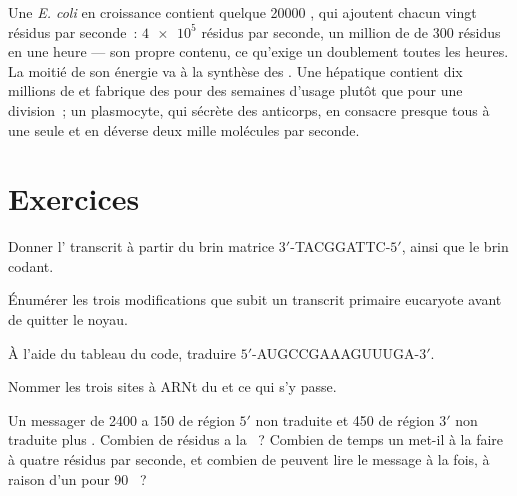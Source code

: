 \begin{example}\label{ex:b1:gene-expression:numbers}
Une \emph{E. coli} en croissance contient quelque \num{20000} ,
qui ajoutent chacun vingt résidus par seconde~: $\num{4e5}$ résidus par
seconde, un million de  de \qty{300}{} résidus en une heure ---
son propre contenu, ce qu'exige un doublement toutes les heures. La
moitié de son énergie va à la synthèse des . Une 
hépatique contient dix millions de  et fabrique des 
pour des semaines d'usage plutôt que pour une division~; un plasmocyte,
qui sécrète des anticorps, en consacre presque tous à une seule 
et en déverse deux mille molécules par seconde.
\end{example}

\section{Exercices}

\begin{exercise}[$\star$]\label{exo:b1:gene-expression:1}
Donner l' transcrit à partir du brin matrice
$3'$-TACGGATTC-$5'$, ainsi que le brin codant.
\end{exercise}

\begin{exercise}[$\star$]\label{exo:b1:gene-expression:2}
Énumérer les trois modifications que subit un transcrit primaire
eucaryote avant de quitter le noyau.
\end{exercise}

\begin{exercise}[$\star$]\label{exo:b1:gene-expression:3}
À l'aide du tableau du code, traduire $5'$-AUGCCGAAAGUUUGA-$3'$.
\end{exercise}

\begin{exercise}[$\star$]\label{exo:b1:gene-expression:4}
Nommer les trois sites à ARNt du  et ce qui s'y passe.
\end{exercise}

\begin{exercise}[$\star\star$]\label{exo:b1:gene-expression:5}
Un messager de \qty{2400}{}  a \qty{150}{}  de
région $5'$ non traduite et \qty{450}{} de région $3'$ non traduite plus
. Combien de résidus a la ~? Combien de temps un
 met-il à la faire à quatre résidus par seconde, et combien de
 peuvent lire le message à la fois, à raison d'un pour
\qty{90}{} ~?
\end{exercise}

